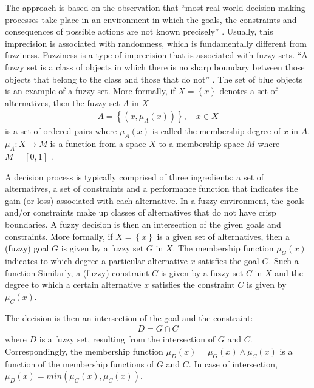 The approach is based on the observation that ``most real world decision making processes take place in an environment in which the goals, the constraints and consequences of possible actions are not known precisely'' \cite{Bellman:1970}. Usually, this imprecision is associated with randomness, which is fundamentally different from fuzziness. Fuzziness is a type of imprecision that is associated with fuzzy sets. ``A fuzzy set is a class of objects in which there is no sharp boundary between those objects that belong to the class and those that do not'' \cite{Bellman:1970}. The set of blue objects is an example of a fuzzy set. More formally, if $X = \left\{x\right\}$ denotes a set of alternatives, then the fuzzy set $A$ in $X$
\begin{gather*}
    A = \left\{\left(x, \mu_A\left(x\right)\right)\right\}, \quad x \in X
\end{gather*}
is a set of ordered pairs where $\mu_A\left(x\right)$ is called the membership degree of $x$ in $A$. $\mu_A : X \rightarrow M$ is a function from a space $X$ to a membership space $M$ where $M = [0, 1]$ \cite{Bellman:1970}.

A decision process is typically comprised of three ingredients: a set of alternatives, a set of constraints and a performance function that indicates the gain (or loss) associated with each alternative. In a fuzzy environment, the goals and/or constraints make up classes of alternatives that do not have crisp boundaries. A fuzzy decision is then an intersection of the given goals and constraints. More formally, if $X = \left\{x\right\}$ is a given set of alternatives, then a (fuzzy) goal $G$ is given by a fuzzy set $G$ in $X$. The membership function $\mu_G\left(x\right)$ indicates to which degree a particular alternative $x$ satisfies the goal $G$. Such a function Similarly, a (fuzzy) constraint $C$ is given by a fuzzy set $C$ in $X$ and the degree to which a certain alternative $x$ satisfies the constraint $C$ is given by $\mu_C\left(x\right)$.

The decision is then an intersection of the goal and the constraint:
\begin{gather*}
    D = G \cap C
\end{gather*}
where $D$ is a fuzzy set, resulting from the intersection of $G$ and $C$. Correspondingly, the membership function $\mu_D\left(x\right) = \mu_G\left(x\right) \wedge \mu_C\left(x\right)$ is a function of the membership functions of $G$ and $C$. In case of intersection, $\mu_D\left(x\right) = min\left(\mu_G\left(x\right), \mu_C\left(x\right)\right)$.
 
